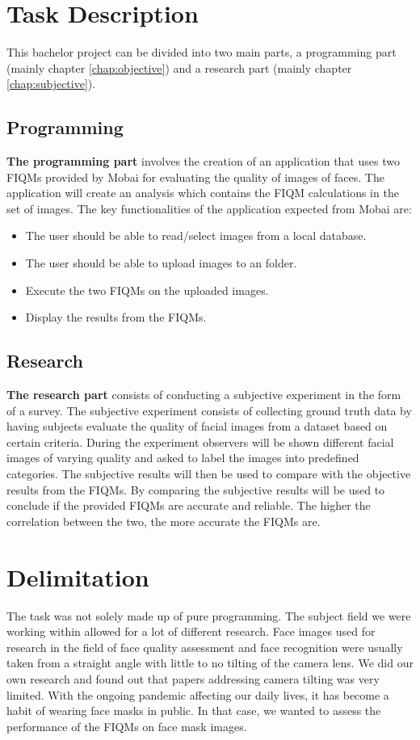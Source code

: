 \section{Task Description}  
\label{sec:TaskD}
This bachelor project can be divided into two main parts, a programming part (mainly chapter \ref{chap:objective}) and a research part (mainly chapter \ref{chap:subjective}).

\subsection*{Programming}
\textbf{The programming part} involves the creation of an application that uses two FIQMs provided by Mobai for evaluating the quality of images of faces. The application will create an analysis which contains the FIQM calculations in the set of images. The key functionalities of the application expected from Mobai are: 
\begin{itemize}
    \item The user should be able to read/select images from a local database.
    \item The user should be able to upload images to an folder.
    \item Execute the two FIQMs on the uploaded images.
    \item Display the results from the FIQMs. 
\end{itemize}

\subsection*{Research}
\textbf{The research part} consists of conducting a subjective experiment in the form of a survey. The subjective experiment consists of collecting ground truth data by having subjects evaluate the quality of facial images from a dataset based on certain criteria. During the experiment observers will be shown different facial images of varying quality and asked to label the images into predefined categories. The subjective results will then be used to compare with the objective results from the FIQMs. By comparing the subjective results will be used to conclude if the provided FIQMs are accurate and reliable. The higher the correlation between the two, the more accurate the FIQMs are. 

\section{Delimitation}
The task was not solely made up of pure programming. The subject field we were working within allowed for a lot of different research. Face images used for research in the field of face quality assessment and face recognition were usually taken from a straight angle with little to no tilting of the camera lens. We did our own research and found out that papers addressing camera tilting was very limited. With the ongoing pandemic affecting our daily lives, it has become a habit of wearing face masks in public. In that case, we wanted to assess the performance of the FIQMs on face mask images. 

